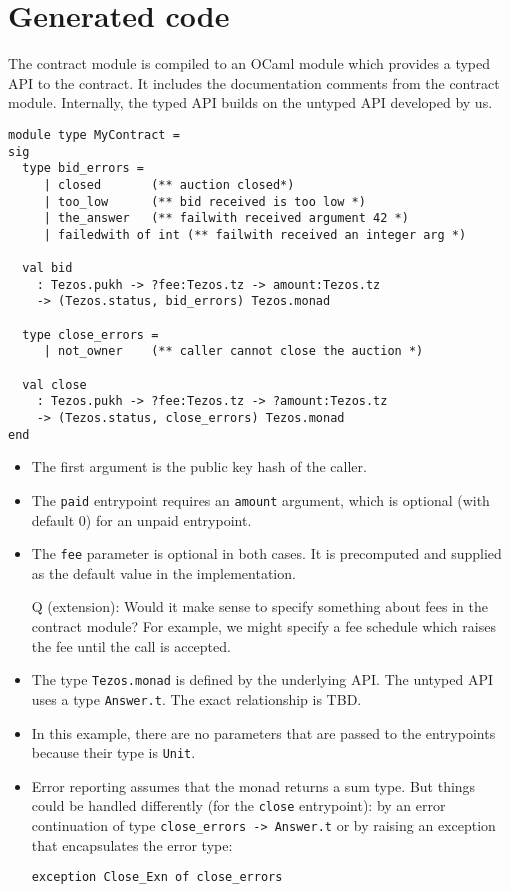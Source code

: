 \documentclass[a4paper]{llncs}
\begin{document}
\section{Generated code}
\label{sec:generated-code}


The contract module is compiled to an OCaml module which provides a typed API to the
contract. It includes the documentation comments from the contract
module. Internally, the typed API builds on the untyped API developed
by us. 

\begin{lstlisting}[caption={Generated signature},label={lst:generated-signature}]
module type MyContract =
sig
  type bid_errors = 
     | closed       (** auction closed*)
     | too_low      (** bid received is too low *)
     | the_answer   (** failwith received argument 42 *)
     | failedwith of int (** failwith received an integer arg *)

  val bid
    : Tezos.pukh -> ?fee:Tezos.tz -> amount:Tezos.tz
    -> (Tezos.status, bid_errors) Tezos.monad

  type close_errors = 
     | not_owner    (** caller cannot close the auction *)

  val close
    : Tezos.pukh -> ?fee:Tezos.tz -> ?amount:Tezos.tz
    -> (Tezos.status, close_errors) Tezos.monad
end
\end{lstlisting}

\begin{itemize}
\item The first argument is the public key hash of the caller. 
\item The \lstinline/paid/ entrypoint requires an \lstinline/amount/
  argument, which is optional (with default 0) for an unpaid
  entrypoint.
\item The \lstinline/fee/ parameter is optional in both
  cases. It is precomputed and supplied as the default value in the
  implementation.

  Q (extension): Would it make sense to specify something about fees in the
  contract module? For example, we might specify a fee schedule which
  raises the fee until the call is accepted.
\item The type \lstinline/Tezos.monad/ is defined by the underlying
  API. The untyped API uses a type \lstinline/Answer.t/. The exact
  relationship is TBD.
\item In this example, there are no parameters that are passed to the
  entrypoints because their type is \lstinline/Unit/.
\item Error reporting assumes that the monad returns a sum type. But
  things could be handled differently (for the
  \lstinline/close/ entrypoint): by an error continuation of
  type \lstinline/close_errors -> Answer.t/ or by
  raising an exception that encapsulates the error type:
\begin{lstlisting}
exception Close_Exn of close_errors
\end{lstlisting}
\end{itemize}
\end{document}
